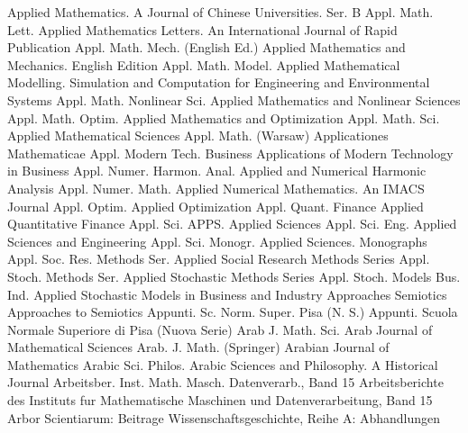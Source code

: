 {Applied Mathematics. A Journal of Chinese Universities. Ser. B}
{Appl. Math. Lett.}
{Applied Mathematics Letters. An International Journal of Rapid Publication}
{Appl. Math. Mech. (English Ed.)}
{Applied Mathematics and Mechanics. English Edition}
{Appl. Math. Model.}
{Applied Mathematical Modelling. Simulation and Computation for Engineering and Environmental Systems}
{Appl. Math. Nonlinear Sci.}
{Applied Mathematics and Nonlinear Sciences}
{Appl. Math. Optim.}
{Applied Mathematics and Optimization}
{Appl. Math. Sci.}
{Applied Mathematical Sciences}
{Appl. Math. (Warsaw)}
{Applicationes Mathematicae}
{Appl. Modern Tech. Business}
{Applications of Modern Technology in Business}
{Appl. Numer. Harmon. Anal.}
{Applied and Numerical Harmonic Analysis}
{Appl. Numer. Math.}
{Applied Numerical Mathematics. An IMACS Journal}
{Appl. Optim.}
{Applied Optimization}
{Appl. Quant. Finance}
{Applied Quantitative Finance}
{Appl. Sci.}
{APPS. Applied Sciences}
{Appl. Sci. Eng.}
{Applied Sciences and Engineering}
{Appl. Sci. Monogr.}
{Applied Sciences. Monographs}
{Appl. Soc. Res. Methods Ser.}
{Applied Social Research Methods Series}
{Appl. Stoch. Methods Ser.}
{Applied Stochastic Methods Series}
{Appl. Stoch. Models Bus. Ind.}
{Applied Stochastic Models in Business and Industry}
{Approaches Semiotics}
{Approaches to Semiotics}
{Appunti. Sc. Norm. Super. Pisa (N. S.)}
{Appunti. Scuola Normale Superiore di Pisa (Nuova Serie)}
{Arab J. Math. Sci.}
{Arab Journal of Mathematical Sciences}
{Arab. J. Math. (Springer)}
{Arabian Journal of Mathematics}
{Arabic Sci. Philos.}
{Arabic Sciences and Philosophy. A Historical Journal}
{Arbeitsber. Inst. Math. Masch. Datenverarb., Band 15}
{Arbeitsberichte des Instituts fur Mathematische Maschinen und Datenverarbeitung, Band 15}
{Arbor Scientiarum: Beitrage Wissenschaftsgeschichte, Reihe A: Abhandlungen}
